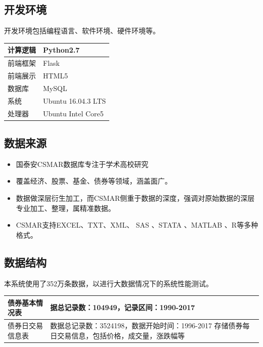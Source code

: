 \subsection{开发环境}
开发环境包括编程语言、软件环境、硬件环境等。
\begin{table}[H]
\begin{adjustwidth}{-3cm}{-3cm}
\begin{center}
\begin{tabular}{|p{}| p{}|} \hline
计算逻辑 & Python2.7  \\ \hline
前端框架 & Flask  \\ \hline
前端展示 & HTML5  \\ \hline
数据库 & MySQL \\ \hline

系统 & Ubuntu 16.04.3 LTS  \\ \hline

处理器 & Ubuntu Intel Core5  \\ \hline
\end{tabular}
\end{center}
\end{adjustwidth}
\end{table}



\subsection{数据来源}
\begin{itemize}
\item 国泰安CSMAR数据库专注于学术高校研究

\item 覆盖经济、股票、基金、债券等领域，涵盖面广。

\item 数据做深层衍生加工，而CSMAR侧重于数据的深度，强调对原始数据的深层专业加工、整理，属精准数据。

\item CSMAR支持EXCEL、TXT、XML、 SAS 、STATA 、MATLAB 、R等多种格式。

\end{itemize}

\subsection{数据结构}
本系统使用了352万条数据，以进行大数据情况下的系统性能测试。
\begin{table}[H]
\begin{adjustwidth}{-3cm}{-3cm}
\begin{center}
\begin{tabular}{|p{}| p{}|} \hline
债券基本情况表 & 据总记录数：104949，记录区间：1990-2017  \\ \hline
债券日交易信息表 & 数据总记录数：3524198，数据开始时间：1996-2017
存储债券每日交易信息，包括价格，成交量，涨跌幅等
 \\ \hline
\end{tabular}
\end{center}
\end{adjustwidth}
\end{table}

